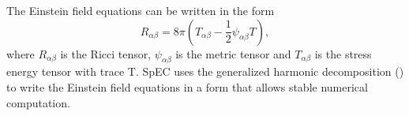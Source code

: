 %
The Einstein field equations can be written in the form
%
\begin{equation}
  \label{eqn:efe}
R_{\alpha\beta} = 8\pi\left(T_{\alpha\beta} - \frac{1}{2}\psi_{\alpha\beta}T\right),
\end{equation}
%
where $R_{\alpha\beta}$ is the Ricci tensor, $\psi_{\alpha\beta}$ is the metric tensor and $T_{\alpha\beta}$ is the stress energy tensor with trace T. SpEC uses the generalized harmonic decomposition (\cite{lindblom2006}) to write the Einstein field equations in a form that allows stable numerical computation.

